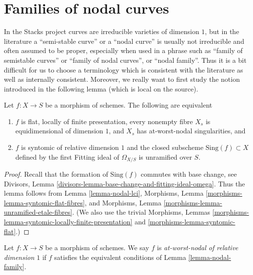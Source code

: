 \section{Families of nodal curves}
\label{section-families-nodal}

\noindent
In the Stacks project curves are irreducible varieties of dimension $1$,
but in the literature a ``semi-stable curve'' or a ``nodal curve'' is
usually not irreducible and often assumed to be proper, especially
when used in a phrase such as ``family of semistable curves'' or
``family of nodal curves'', or ``nodal family''. Thus it is a bit
difficult for us to choose a terminology which is consistent with the
literature as well as internally consistent. Moreover, we really want
to first study the notion introduced in the following lemma (which is
local on the source).

\begin{lemma}
\label{lemma-nodal-family}
Let $f : X \to S$ be a morphism of schemes. The following are equivalent
\begin{enumerate}
\item $f$ is flat, locally of finite presentation, every nonempty fibre
$X_s$ is equidimensional of dimension $1$, and $X_s$ has
at-worst-nodal singularities, and
\item $f$ is syntomic of relative dimension $1$ and the closed subscheme
$\text{Sing}(f) \subset X$ defined by the first Fitting ideal of
$\Omega_{X/S}$ is unramified over $S$.
\end{enumerate}
\end{lemma}

\begin{proof}
Recall that the formation of $\text{Sing}(f)$ commutes with base
change, see Divisors, Lemma
\ref{divisors-lemma-base-change-and-fitting-ideal-omega}.
Thus the lemma follows from Lemma \ref{lemma-nodal-lci},
Morphisms, Lemma \ref{morphisms-lemma-syntomic-flat-fibres}, and
Morphisms, Lemma \ref{morphisms-lemma-unramified-etale-fibres}.
(We also use the trivial
Morphisms, Lemmas \ref{morphisms-lemma-syntomic-locally-finite-presentation}
and \ref{morphisms-lemma-syntomic-flat}.)
\end{proof}

\begin{definition}
\label{definition-nodal-family}
Let $f : X \to S$ be a morphism of schemes. We say $f$ is
{\it at-worst-nodal of relative dimension $1$} if $f$ satisfies
the equivalent conditions of Lemma \ref{lemma-nodal-family}.
\end{definition}

